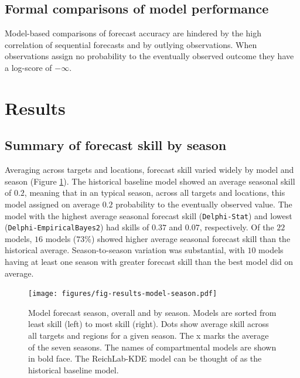 \documentclass{article}\usepackage[]{graphicx}\usepackage[]{color}
\begin{document}
\subsection{Formal comparisons of model performance}

Model-based comparisons of forecast accuracy are hindered by the high correlation of sequential forecasts and by outlying observations. 
When observations assign no probability to the eventually observed outcome they have a log-score of $-\infty$.


\section{Results}

\subsection{Summary of forecast skill by season}



Averaging across targets and locations, forecast skill varied widely by model and season (Figure \ref{fig:results-season}). 
The historical baseline model showed an average seasonal skill of 
$0.2$, 
meaning that in an typical season, across all targets and locations, this model assigned on average 
$0.2$ 
probability to the eventually observed value. 
The model with the highest average seasonal forecast skill 
({\tt Delphi-Stat}) 
and lowest 
({\tt Delphi-EmpiricalBayes2}) 
had skills of $0.37$ and $0.07$, respectively. 
Of the $22$ models, $16$ models 
($73$\%) 
showed higher average seasonal forecast skill than the historical average.
Season-to-season variation was substantial, with 
$10$ 
models having at least one season with greater forecast skill than the best model did on average.

\begin{figure}[htbp]
\begin{center}
\texttt{[image: figures/fig-results-model-season.pdf]}
\caption{Model forecast season, overall and by season. Models are sorted from least skill (left) to most skill (right). Dots show average skill across all targets and regions for a given season. The x marks the average of the seven seasons. The names of compartmental models are shown in bold face. The ReichLab-KDE model can be thought of as the historical baseline model.}
\label{fig:results-season}
\end{center}
\end{figure}
\end{document}
